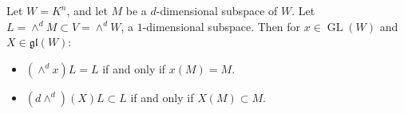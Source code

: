 Let $W = K^n$, and let $M$ be a $d$-dimensional subspace of $W$. Let $L = \wedge^d M \subset V = \wedge^d W$, a $1$-dimensional subspace. Then for $x \in \operatorname{GL}(W)$ and $X \in \mathfrak{gl}(W)$:
\begin{itemize}
\item[(a)] $(\wedge^d x)L = L$ if and only if $x(M) = M$.
\item[(b)] $(d\wedge^d)(X)L \subset L$ if and only if $X(M) \subset M$.
\end{itemize}
